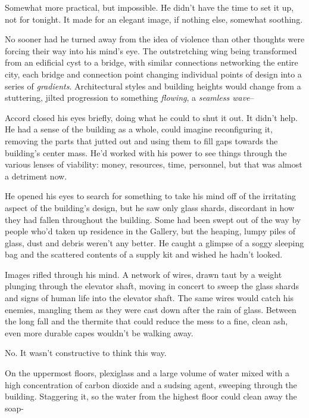 Somewhat more practical, but impossible.  He didn't have the time to set it up, not for tonight.  It made for an elegant image, if nothing else, somewhat soothing.



No sooner had he turned away from the idea of violence than other thoughts were forcing their way into his mind's eye.  The outstretching wing being transformed from an edificial cyst to a bridge, with similar connections networking the entire city, each bridge and connection point changing individual points of design into a series of \emph{gradients}.  Architectural styles and building heights would change from a stuttering, jilted progression to something \emph{flowing}, a \emph{seamless wave}–



Accord closed his eyes briefly, doing what he could to shut it out.  It didn't help.  He had a sense of the building as a whole, could imagine reconfiguring it, removing the parts that jutted out and using them to fill gaps towards the building's center mass.  He'd worked with his power to see things through the various lenses of viability: money, resources, time, personnel, but that was almost a detriment now.



He opened his eyes to search for something to take his mind off of the irritating aspect of the building's design, but he saw only glass shards, discordant in how they had fallen throughout the building.  Some had been swept out of the way by people who'd taken up residence in the Gallery, but the heaping, lumpy piles of glass, dust and debris weren't any better.  He caught a glimpse of a soggy sleeping bag and the scattered contents of a supply kit and wished he hadn't looked.



Images rifled through his mind.  A network of wires, drawn taut by a weight plunging through the elevator shaft, moving in concert to sweep the glass shards and signs of human life into the elevator shaft.  The same wires would catch his enemies, mangling them as they were cast down after the rain of glass.  Between the long fall and the thermite that could reduce the mess to a fine, clean ash, even more durable capes wouldn't be walking away.



No.  It wasn't constructive to think this way.



On the uppermost floors, plexiglass and a large volume of water mixed with a high concentration of carbon dioxide and a sudsing agent, sweeping through the building.  Staggering it, so the water from the highest floor could clean away the soap-



